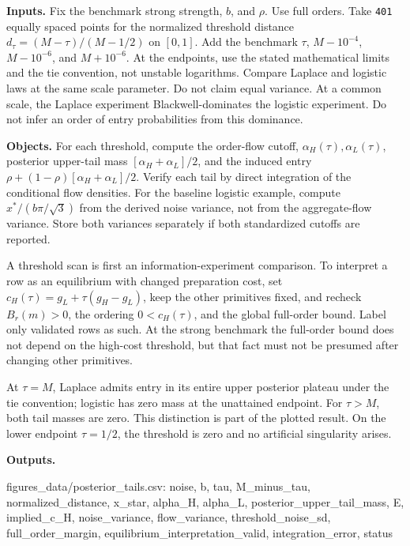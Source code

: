 \documentclass[
  11pt,
]{article}
\newenvironment{Shaded}{}{}
\newcommand{\NormalTok}[1]{#1}
\begin{document}
\textbf{Inputs.} Fix the benchmark strong strength, \(b\), and \(\rho\).
Use full orders.
Take \texttt{401} equally spaced points for the normalized threshold distance
\(d_\tau=(M-\tau)/(M-1/2)\) on \([0,1]\).
Add the benchmark \(\tau\), \(M-10^{-4}\), \(M-10^{-6}\), and \(M+10^{-6}\).
At the endpoints, use the stated mathematical limits and the tie convention, not unstable logarithms.
Compare Laplace and logistic laws at the same scale parameter.
Do not claim equal variance.
At a common scale, the Laplace experiment Blackwell-dominates the logistic experiment.
Do not infer an order of entry probabilities from this dominance.

\textbf{Objects.} For each threshold, compute the order-flow cutoff,
\(\alpha_H(\tau),\alpha_L(\tau)\), posterior upper-tail mass
\([\alpha_H+\alpha_L]/2\), and the induced entry
\(\rho+(1-\rho)[\alpha_H+\alpha_L]/2\). Verify each tail by direct
integration of the conditional flow densities. For the baseline logistic
example, compute \(x^*/(b\pi/\sqrt3)\) from the derived noise variance,
not from the aggregate-flow variance. Store both variances separately if
both standardized cutoffs are reported.

A threshold scan is first an information-experiment comparison. To
interpret a row as an equilibrium with changed preparation cost, set
\(c_H(\tau)=g_L+\tau(g_H-g_L)\), keep the other primitives fixed, and
recheck \(B_r(m)>0\), the ordering \(0<c_H(\tau)\), and the global full-order bound.
Label only validated rows as such. At the strong benchmark the
full-order bound does not depend on the high-cost threshold, but that
fact must not be presumed after changing other primitives.

At \(\tau=M\), Laplace admits entry in its entire upper posterior
plateau under the tie convention; logistic has zero mass at the
unattained endpoint. For \(\tau>M\), both tail masses are zero. This
distinction is part of the plotted result. On the lower endpoint
\(\tau=1/2\), the threshold is zero and no artificial singularity
arises.

\textbf{Outputs.}

\begin{Shaded}
\begin{Highlighting}[]
\NormalTok{figures\_data/posterior\_tails.csv:}
\NormalTok{noise, b, tau, M\_minus\_tau, normalized\_distance, x\_star,}
\NormalTok{alpha\_H, alpha\_L, posterior\_upper\_tail\_mass, E,}
\NormalTok{implied\_c\_H, noise\_variance, flow\_variance, threshold\_noise\_sd,}
\NormalTok{full\_order\_margin, equilibrium\_interpretation\_valid,}
\NormalTok{integration\_error, status}
\end{Highlighting}
\end{Shaded}
\end{document}
